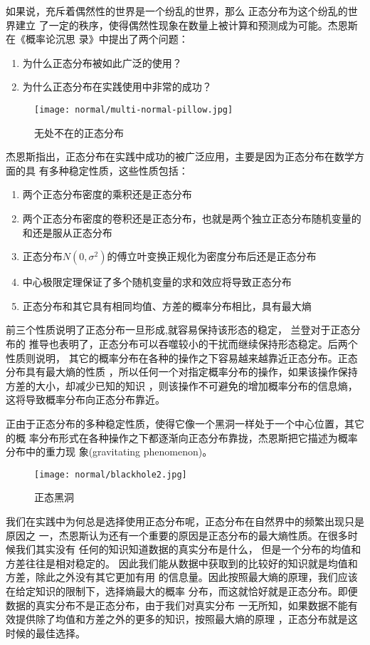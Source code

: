 如果说，充斥着偶然性的世界是一个纷乱的世界，那么    正态分布为这个纷乱的世界建立
了一定的秩序，使得偶然性现象在数量上被计算和预测成为可能。杰恩斯在《概率论沉思
录》中提出了两个问题：
\begin{enumerate}
\item 为什么正态分布被如此广泛的使用？
\item 为什么正态分布在实践使用中非常的成功？
\end{enumerate}

\begin{figure}[!ht]
\centering
\texttt{[image: normal/multi-normal-pillow.jpg]}
\caption{无处不在的正态分布}
\end{figure}

杰恩斯指出，正态分布在实践中成功的被广泛应用，主要是因为正态分布在数学方面的具
有多种稳定性质，这些性质包括：
\begin{enumerate}
\item 两个正态分布密度的乘积还是正态分布
\item 两个正态分布密度的卷积还是正态分布，也就是两个独立正态分布随机变量的和还是服从正态分布
\item 正态分布$N(0, \sigma^2)$的傅立叶变换正规化为密度分布后还是正态分布
\item 中心极限定理保证了多个随机变量的求和效应将导致正态分布
\item 正态分布和其它具有相同均值、方差的概率分布相比，具有最大熵
\end{enumerate}

前三个性质说明了正态分布一旦形成,就容易保持该形态的稳定， 兰登对于正态分布的
推导也表明了，正态分布可以吞噬较小的干扰而继续保持形态稳定。后两个性质则说明，
其它的概率分布在各种的操作之下容易越来越靠近正态分布。正态分布具有最大熵的性质
，所以任何一个对指定概率分布的操作，如果该操作保持方差的大小，却减少已知的知识
，则该操作不可避免的增加概率分布的信息熵，这将导致概率分布向正态分布靠近。

正由于正态分布的多种稳定性质，使得它像一个黑洞一样处于一个中心位置，其它的概
率分布形式在各种操作之下都逐渐向正态分布靠拢，杰恩斯把它描述为概率分布中的重力现
象(gravitating phenomenon)。
\begin{figure}[htbp]
\centering
\texttt{[image: normal/blackhole2.jpg]}
\caption{正态黑洞}
\end{figure}

我们在实践中为何总是选择使用正态分布呢，正态分布在自然界中的频繁出现只是原因之
一，杰恩斯认为还有一个重要的原因是正态分布的最大熵性质。在很多时候我们其实没有
任何的知识知道数据的真实分布是什么， 但是一个分布的均值和方差往往是相对稳定的。
因此我们能从数据中获取到的比较好的知识就是均值和方差，除此之外没有其它更加有用
的信息量。因此按照最大熵的原理，我们应该在给定知识的限制下，选择熵最大的概率
分布，而这就恰好就是正态分布。即便数据的真实分布不是正态分布，由于我们对真实分布
一无所知，如果数据不能有效提供除了均值和方差之外的更多的知识，按照最大熵的原理
，正态分布就是这时候的最佳选择。

